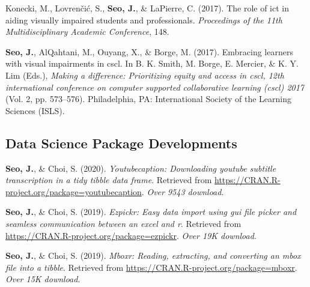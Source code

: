 \documentclass[11pt, a4paper]{awesome-cv}
\begin{document}
\leavevmode\hypertarget{ref-konecki2017role}{}%
Konecki, M., Lovrenčić, S., \textbf{Seo, J.}, \& LaPierre, C. (2017).
The role of ict in aiding visually impaired students and professionals.
\emph{Proceedings of the 11th Multidisciplinary Academic Conference},
148.

\leavevmode\hypertarget{ref-seo2017embracing}{}%
\textbf{Seo, J.}, AlQahtani, M., Ouyang, X., \& Borge, M. (2017).
Embracing learners with visual impairments in cscl. In B. K. Smith, M.
Borge, E. Mercier, \& K. Y. Lim (Eds.), \emph{Making a difference:
Prioritizing equity and access in cscl, 12th international conference on
computer supported collaborative learning (cscl) 2017} (Vol. 2, pp.
573--576). Philadelphia, PA: International Society of the Learning
Sciences (ISLS).

\hypertarget{data-science-package-developments}{%
\subsection{Data Science Package
Developments}\label{data-science-package-developments}}

\hypertarget{refs_R_packages}{}
\leavevmode\hypertarget{ref-R-youtubecaption}{}%
\textbf{Seo, J.}, \& Choi, S. (2020). \emph{Youtubecaption: Downloading
youtube subtitle transcription in a tidy tibble data frame}. Retrieved
from \url{https://CRAN.R-project.org/package=youtubecaption}. \emph{Over
9543 download}.

\leavevmode\hypertarget{ref-R-ezpickr}{}%
\textbf{Seo, J.}, \& Choi, S. (2019). \emph{Ezpickr: Easy data import
using gui file picker and seamless communication between an excel and
r}. Retrieved from \url{https://CRAN.R-project.org/package=ezpickr}.
\emph{Over 19K download}.

\leavevmode\hypertarget{ref-R-mboxr}{}%
\textbf{Seo, J.}, \& Choi, S. (2019). \emph{Mboxr: Reading, extracting,
and converting an mbox file into a tibble}. Retrieved from
\url{https://CRAN.R-project.org/package=mboxr}. \emph{Over 15K
download}.
\end{document}
